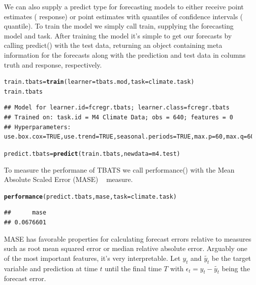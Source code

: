 \documentclass{article}\usepackage[]{graphicx}\usepackage[]{color}
\makeatletter
\newcommand{\hlstd}[1]{\textcolor[rgb]{0.345,0.345,0.345}{#1}}%
\newcommand{\hlkwb}[1]{\textcolor[rgb]{0.69,0.353,0.396}{#1}}%
\newcommand{\hlkwc}[1]{\textcolor[rgb]{0.333,0.667,0.333}{#1}}%
\newcommand{\hlkwd}[1]{\textcolor[rgb]{0.737,0.353,0.396}{\textbf{#1}}}%
\newenvironment{kframe}{%
 \def\at@end@of@kframe{}%
 \ifinner\ifhmode%
  \def\at@end@of@kframe{\end{minipage}}%
  \begin{minipage}{\columnwidth}%
 \fi\fi%
 \def\FrameCommand##1{\hskip\@totalleftmargin \hskip-\fboxsep
 \colorbox{shadecolor}{##1}\hskip-\fboxsep
     \hskip-\linewidth \hskip-\@totalleftmargin \hskip\columnwidth}%
 \MakeFramed {\advance\hsize-\width
   \@totalleftmargin\z@ \linewidth\hsize
   \@setminipage}}%
 {\par\unskip\endMakeFramed%
 \at@end@of@kframe}
\newenvironment{knitrout}{}{} %
\theoremstyle{definition}
\newcommand\code{\@codex}
\def\@codex#1{{\normalfont\ttfamily\hyphenchar\font=-1 #1}}
\makeatother
\begin{document}
We can also supply a predict type for forecasting models to either receive point estimates (\code{response}) or point estimates with quantiles of confidence intervals (\code{quantile}). To train the model we simply call train, supplying the forecasting model and task. After training the model it's simple to get our forecasts by calling \code{predict()} with the test data, returning an object containing meta information for the forecasts along with the prediction and test data in columns \code{truth} and \code{response}, respectively.

\begin{knitrout}
\color{fgcolor}\begin{kframe}
\begin{alltt}
\hlstd{train.tbats}\hlkwb{=} \hlkwd{train}\hlstd{(}\hlkwc{learner} \hlstd{= tbats.mod,} \hlkwc{task} \hlstd{= climate.task )}
\hlstd{train.tbats}
\end{alltt}
\begin{verbatim}
## Model for learner.id=fcregr.tbats; learner.class=fcregr.tbats
## Trained on: task.id = M4 Climate Data; obs = 640; features = 0
## Hyperparameters: use.box.cox=TRUE,use.trend=TRUE,seasonal.periods=TRUE,max.p=60,max.q=60,stationary=FALSE,use.arma.errors=TRUE,h=35
\end{verbatim}
\begin{alltt}
\hlstd{predict.tbats} \hlkwb{=} \hlkwd{predict}\hlstd{(train.tbats,} \hlkwc{newdata} \hlstd{= m4.test)}
\end{alltt}
\end{kframe}
\end{knitrout}

To measure the performane of TBATS we call \code{performance()} with the Mean Absolute Scaled Error (MASE) ~\cite{Hyndman2006} measure.

\begin{knitrout}
\color{fgcolor}\begin{kframe}
\begin{alltt}
\hlkwd{performance}\hlstd{(predict.tbats, mase,} \hlkwc{task} \hlstd{= climate.task)}
\end{alltt}
\begin{verbatim}
##      mase 
## 0.0676601
\end{verbatim}
\end{kframe}
\end{knitrout}

MASE has favorable properties for calculating forecast errors relative to measures such as root mean squared error or median relative absolute error. Arguably one of the most important features, it's very interpretable. Let $y_t$ and $\tilde{y_t}$ be the target variable and prediction at time $t$ until the final time $T$ with $\epsilon_t = y_t - \tilde{y_t}$ being the forecast error. 
\end{document}
